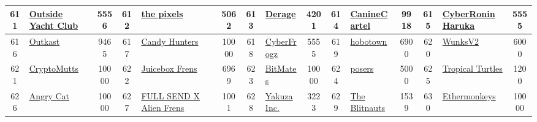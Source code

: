 \begin{table*}[]
{\begin{tabular}{|c|l|c|c|l|c|c|l|c|c|l|c|c|l|c|}
        611   & \href{https://outsideyc.com/}{Outside Yacht Club}                                  & 5556              & 612   & \href{https://int.art}{the pixels}                                                                & 5062              & 613   & \href{http://darkfarms.net}{Derage}                                               & 4201              & 614   & \href{https://caninecartel.dog/}{CanineCartel}                                & 9918              & 615   & \href{http://harukaronin.io}{CyberRonin Haruka}                                           & 5555                                    \\ \hline
        616   & \href{https://outkast.world/}{Outkast}                                             & 9465              & 617   & \href{https://candyhuntersnft.io}{Candy Hunters}                                                  & 10000             & 618   & \href{http://cyberfrogz.io}{CyberFrogz}                                           & 5555              & 619   & \href{http://www.hobotown.wtf/}{hobotown}                                     & 6900              & 620   & \href{https://wunks.xyz}{WunksV2}                                                         & 6000                                    \\ \hline
        621   & \href{http://cryptomutts.io}{CryptoMutts}                                          & 10000             & 622   & \href{https://opensea.io/collection/juiceboxfrens}{Juicebox Frens}                                & 6969              & 623   & \href{https://bitmates.io}{BitMates}                                              & 10000             & 624   & \href{https://posers.app}{posers}                                             & 5000              & 625   & \href{http://tropicalturtles.io}{Tropical Turtles}                                        & 1200                                    \\ \hline
        626   & \href{https://angrycat.io/}{Angry Cat}                                             & 10000             & 627   & \href{http://metacard.io}{FULL SEND X Alien Frens}                                                & 1001              & 628   & \href{http://yakuzainc.io}{Yakuza Inc.}                                           & 3223              & 629   & \href{https://blitnauts.blitmap.com}{The Blitnauts}                           & 1539              & 630   & \href{https://opensea.io/collection/ethermonkeys}{Ethermonkeys}                           & 10000                                   \\ \hline
    
                   \end{tabular}
               }
        \end{table*}
    
